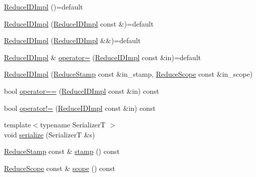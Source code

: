 \begin{DoxyCompactItemize}
\item 
\hyperlink{structvt_1_1collective_1_1reduce_1_1detail_1_1_reduce_i_d_impl_a02838391cc76625466de53c8197baead}{Reduce\+I\+D\+Impl} ()=default
\item 
\hyperlink{structvt_1_1collective_1_1reduce_1_1detail_1_1_reduce_i_d_impl_afc9000bf90d9cde00276e559a070bd17}{Reduce\+I\+D\+Impl} (\hyperlink{structvt_1_1collective_1_1reduce_1_1detail_1_1_reduce_i_d_impl}{Reduce\+I\+D\+Impl} const \&)=default
\item 
\hyperlink{structvt_1_1collective_1_1reduce_1_1detail_1_1_reduce_i_d_impl_a3476a2d196c68a45ffef12333e6cdf5d}{Reduce\+I\+D\+Impl} (\hyperlink{structvt_1_1collective_1_1reduce_1_1detail_1_1_reduce_i_d_impl}{Reduce\+I\+D\+Impl} \&\&)=default
\item 
\hyperlink{structvt_1_1collective_1_1reduce_1_1detail_1_1_reduce_i_d_impl}{Reduce\+I\+D\+Impl} \& \hyperlink{structvt_1_1collective_1_1reduce_1_1detail_1_1_reduce_i_d_impl_a96f5723202097c667e0c01a707528f82}{operator=} (\hyperlink{structvt_1_1collective_1_1reduce_1_1detail_1_1_reduce_i_d_impl}{Reduce\+I\+D\+Impl} const \&in)=default
\item 
\hyperlink{structvt_1_1collective_1_1reduce_1_1detail_1_1_reduce_i_d_impl_ac0e808d85213c4fedc3d1bae43744aed}{Reduce\+I\+D\+Impl} (\hyperlink{namespacevt_1_1collective_1_1reduce_1_1detail_aacc1fcd729d934ba143fee3a943bf9e7}{Reduce\+Stamp} const \&in\+\_\+stamp, \hyperlink{structvt_1_1collective_1_1reduce_1_1detail_1_1_reduce_scope}{Reduce\+Scope} const \&in\+\_\+scope)
\item 
bool \hyperlink{structvt_1_1collective_1_1reduce_1_1detail_1_1_reduce_i_d_impl_a9bcc8db2ce4c3c2cb2606a9bdd93debb}{operator==} (\hyperlink{structvt_1_1collective_1_1reduce_1_1detail_1_1_reduce_i_d_impl}{Reduce\+I\+D\+Impl} const \&in) const
\item 
bool \hyperlink{structvt_1_1collective_1_1reduce_1_1detail_1_1_reduce_i_d_impl_a9c445823cc9899b72bfcbb811b8d2603}{operator!=} (\hyperlink{structvt_1_1collective_1_1reduce_1_1detail_1_1_reduce_i_d_impl}{Reduce\+I\+D\+Impl} const \&in) const
\item 
{\footnotesize template$<$typename SerializerT $>$ }\\void \hyperlink{structvt_1_1collective_1_1reduce_1_1detail_1_1_reduce_i_d_impl_ad5b9cd7f62b54fca25932232cb6baebd}{serialize} (SerializerT \&s)
\item 
\hyperlink{namespacevt_1_1collective_1_1reduce_1_1detail_aacc1fcd729d934ba143fee3a943bf9e7}{Reduce\+Stamp} const  \& \hyperlink{structvt_1_1collective_1_1reduce_1_1detail_1_1_reduce_i_d_impl_a72f8c00e09eeb3106b162c9d5b06af05}{stamp} () const
\item 
\hyperlink{structvt_1_1collective_1_1reduce_1_1detail_1_1_reduce_scope}{Reduce\+Scope} const  \& \hyperlink{structvt_1_1collective_1_1reduce_1_1detail_1_1_reduce_i_d_impl_adc91349dad2340899b7a11df59528ef2}{scope} () const
\end{DoxyCompactItemize}
